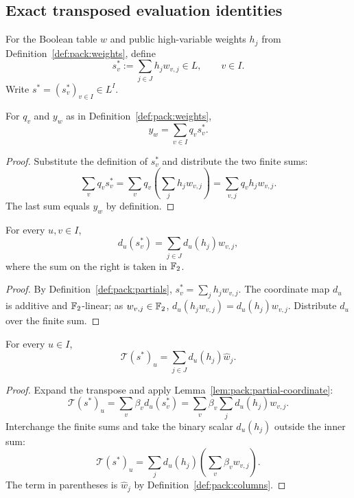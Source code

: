 \subsection{Exact transposed evaluation identities}\label{sec:packing:evaluation}

\begin{definition}\label{def:pack:partials}
For the Boolean table $w$ and public high-variable
weights $h_j$ from Definition~\ref{def:pack:weights},
define
\[
 s_v^*:=\sum_{j\in J}h_jw_{v,j}\in L,
 \qquad v\in I.
\]
Write $s^*=(s_v^*)_{v\in I}\in L^I$.
\end{definition}

\begin{lemma}\label{lem:pack:partial-eval}
For $q_v$ and $y_w$ as in Definition~\ref{def:pack:weights},
\[
 \boxed{y_w=\sum_{v\in I}q_vs_v^*.}
\]
\end{lemma}
\begin{proof}
Substitute the definition of $s_v^*$ and
distribute the two finite sums:
\[
 \sum_vq_vs_v^*
  =\sum_vq_v\left(\sum_jh_jw_{v,j}\right)
  =\sum_{v,j}q_vh_jw_{v,j}.
\]
The last sum equals $y_w$ by definition.
\end{proof}

\begin{lemma}\label{lem:pack:partial-coordinate}
For every $u,v\in I$,
\[
 \boxed{d_u(s_v^*)=\sum_{j\in J}d_u(h_j)w_{v,j},}
\]
where the sum on the right is taken in $\mathbb{F}_2$.
\end{lemma}
\begin{proof}
By Definition~\ref{def:pack:partials},
$s_v^*=\sum_jh_jw_{v,j}$.
The coordinate map $d_u$ is additive and
$\mathbb{F}_2$-linear; as $w_{v,j}\in\mathbb{F}_2$,
$d_u(h_jw_{v,j})=d_u(h_j)w_{v,j}$.
Distribute $d_u$ over the finite sum.
\end{proof}

\begin{theorem}\label{thm:pack:transpose-packed}
For every $u\in I$,
\[
 \boxed{
 \mathcal T(s^*)_u
 =\sum_{j\in J}d_u(h_j)\widehat w_j.}
\]
\end{theorem}
\begin{proof}
Expand the transpose and apply
Lemma~\ref{lem:pack:partial-coordinate}:
\[
 \mathcal T(s^*)_u
 =\sum_v\beta_vd_u(s_v^*)
 =\sum_v\beta_v\sum_jd_u(h_j)w_{v,j}.
\]
Interchange the finite sums and take the
binary scalar $d_u(h_j)$ outside the inner sum:
\[
 \mathcal T(s^*)_u
 =\sum_jd_u(h_j)\left(\sum_v\beta_vw_{v,j}\right).
\]
The term in parentheses is $\widehat w_j$
by Definition~\ref{def:pack:columns}.
\end{proof}

